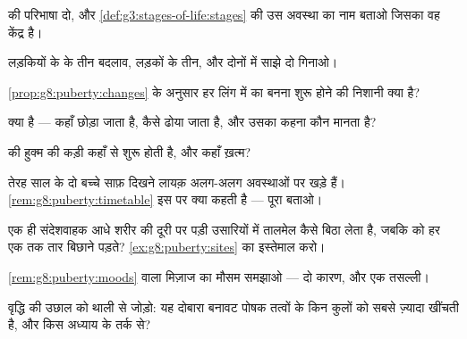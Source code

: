 \begin{exercise}[$\star$]\label{exo:g8:puberty:1}
 की परिभाषा दो, और \cref{def:g3:stages-of-life:stages} की उस
अवस्था का नाम बताओ जिसका वह केंद्र है।
\end{exercise}

\begin{exercise}[$\star$]\label{exo:g8:puberty:2}
लड़कियों के  के तीन बदलाव, लड़कों के तीन, और दोनों में साझे दो
गिनाओ।
\end{exercise}

\begin{exercise}[$\star$]\label{exo:g8:puberty:3}
\cref{prop:g8:puberty:changes} के अनुसार हर लिंग में  का बनना
शुरू होने की निशानी क्या है?
\end{exercise}

\begin{exercise}[$\star$]\label{exo:g8:puberty:4}
 क्या है --- कहाँ छोड़ा जाता है, कैसे ढोया जाता है, और उसका कहना
कौन मानता है?
\end{exercise}

\begin{exercise}[$\star$]\label{exo:g8:puberty:5}
 की हुक्म की कड़ी कहाँ से शुरू होती है, और कहाँ ख़त्म?
\end{exercise}

\begin{exercise}[$\star$]\label{exo:g8:puberty:6}
तेरह साल के दो बच्चे साफ़ दिखने लायक़ अलग-अलग अवस्थाओं पर खड़े हैं।
\cref{rem:g8:puberty:timetable} इस पर क्या कहती है --- पूरा बताओ।
\end{exercise}

\begin{exercise}[$\star\star$]\label{exo:g8:puberty:7}
एक ही संदेशवाहक आधे शरीर की दूरी पर पड़ी उसारियों में तालमेल कैसे बिठा
लेता है, जबकि  को हर एक तक तार बिछाने पड़ते?
\cref{ex:g8:puberty:sites} का इस्तेमाल करो।
\end{exercise}

\begin{exercise}[$\star\star$]\label{exo:g8:puberty:8}
\cref{rem:g8:puberty:moods} वाला मिज़ाज का मौसम समझाओ --- दो कारण, और
एक तसल्ली।
\end{exercise}

\begin{exercise}[$\star\star$]\label{exo:g8:puberty:9}
वृद्धि की उछाल को थाली से जोड़ो: यह दोबारा बनावट पोषक तत्वों के किन
कुलों को सबसे ज़्यादा खींचती है, और किस अध्याय के तर्क से?
\end{exercise}

